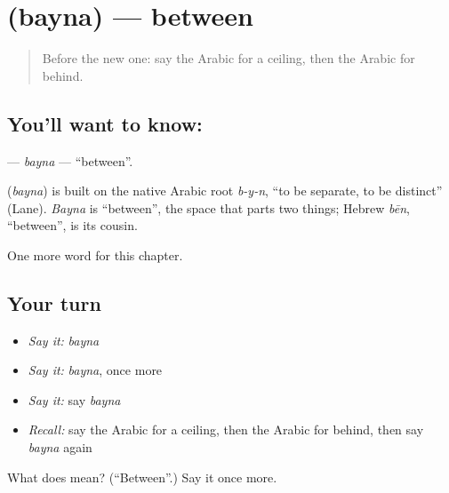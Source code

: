 \section[\texorpdfstring{\ar{بين} (bayna)}{بين (bayna)}]{ (bayna) — between}

\label{lesson:AR-C102-bayna}



\begin{quote}
Before the new one: say the Arabic for a ceiling, then the Arabic for behind.
\end{quote}

\subsection*{You'll want to know: }
\textbf{} — \emph{bayna} — \textquotedblleft{}between\textquotedblright{}.

\begin{cousinweb}
\textbf{} (\emph{bayna}) is built on the native Arabic root \emph{b-y-n}, \textquotedblleft{}to be separate, to be distinct\textquotedblright{} (Lane). \emph{Bayna} is \textquotedblleft{}between\textquotedblright{}, the space that parts two things; Hebrew \emph{bēn}, \textquotedblleft{}between\textquotedblright{}, is its cousin.
\end{cousinweb}

\begin{grammarlens}[title={What you've built}]
One more word for this chapter.
\end{grammarlens}

\subsection*{Your turn}
\begin{itemize}
\raggedright
  \item \emph{Say it:} \emph{bayna}
  \item \emph{Say it:} \emph{bayna}, once more
  \item \emph{Say it:} say \emph{bayna}
  \item \emph{Recall:} say the Arabic for a ceiling, then the Arabic for behind, then say \emph{bayna} again
\end{itemize}

\begin{tcolorbox}[breakable,colback=teal!4,colframe=teal!35!black,title={Before you move on}]
What does  mean? (\textquotedblleft{}Between\textquotedblright{}.) Say it once more.
\end{tcolorbox}

